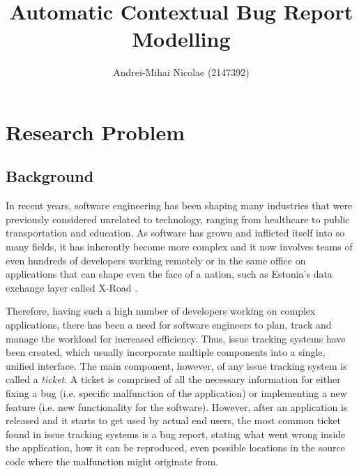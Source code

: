 \documentclass[11pt,english,twocolumn]{article}
\begin{document}
\title{Automatic Contextual Bug Report Modelling}

\author{Andrei-Mihai Nicolae (2147392)}
\date{}
\maketitle

\section{Research Problem}

\subsection*{Background}

In recent years, software engineering has been shaping many industries that were previously
considered unrelated to technology, ranging from healthcare to public transportation
and education. As software has grown and inflicted itself into so many fields, it has 
inherently become more complex and it now involves teams of even hundreds of developers working
remotely or in the same office on applications that can shape even the face of a nation, such
as Estonia's data exchange layer called X-Road \cite{x-road}.

Therefore, having such a high number of developers working on complex applications, there 
has been a need for software engineers to plan, track and manage the workload for increased 
efficiency. Thus, issue tracking systems have been created, which usually incorporate multiple
components into a single, unified interface. The main component, however, of any issue tracking system
is called a \emph{ticket}. A ticket is comprised of all the necessary information for either
fixing a bug (i.e. specific malfunction of the application) or implementing a new feature 
(i.e. new functionality for the software). However, after an application is released and 
it starts to get used by actual end users, the most common ticket found in issue tracking systems
is a bug report, stating what went wrong inside the application, how it can be reproduced,
even possible locations in the source code where the malfunction might originate from.
\end{document}
